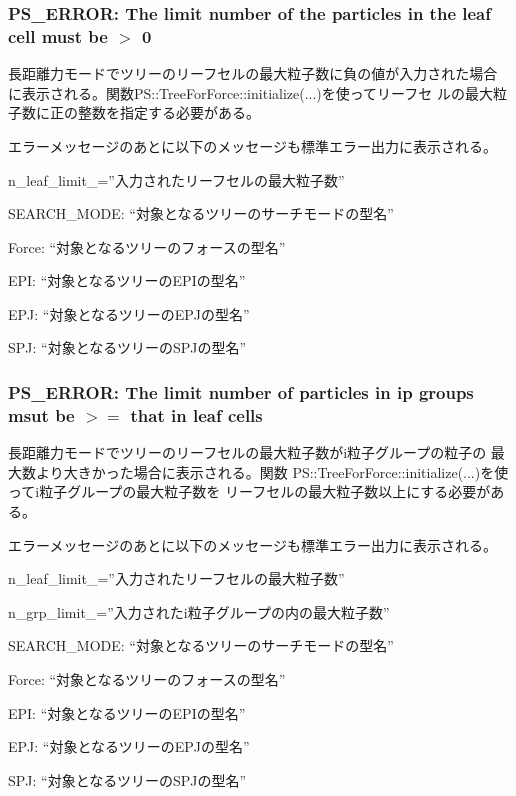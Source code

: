 \subsubsection{PS\_ERROR: The limit number of the particles in the leaf cell must be $>$ 0}

長距離力モードでツリーのリーフセルの最大粒子数に負の値が入力された場合
に表示される。関数{PS::TreeForForce::initialize(...)}を使ってリーフセ
ルの最大粒子数に正の整数を指定する必要がある。

エラーメッセージのあとに以下のメッセージも標準エラー出力に表示される。

\begin{screen}
  n\_leaf\_limit\_=''入力されたリーフセルの最大粒子数''

  SEARCH\_MODE: ``対象となるツリーのサーチモードの型名''

  Force: ``対象となるツリーのフォースの型名''

  EPI: ``対象となるツリーのEPIの型名''

  EPJ: ``対象となるツリーのEPJの型名''

  SPJ: ``対象となるツリーのSPJの型名''
  
\end{screen}

\subsubsection{PS\_ERROR: The limit number of particles in ip groups msut be $>=$ that in leaf cells}

長距離力モードでツリーのリーフセルの最大粒子数がi粒子グループの粒子の
最大数より大きかった場合に表示される。関数
{PS::TreeForForce::initialize(...)}を使ってi粒子グループの最大粒子数を
リーフセルの最大粒子数以上にする必要がある。

エラーメッセージのあとに以下のメッセージも標準エラー出力に表示される。

\begin{screen}
  n\_leaf\_limit\_=''入力されたリーフセルの最大粒子数''

  n\_grp\_limit\_=''入力されたi粒子グループの内の最大粒子数''

  SEARCH\_MODE: ``対象となるツリーのサーチモードの型名''

  Force: ``対象となるツリーのフォースの型名''

  EPI: ``対象となるツリーのEPIの型名''

  EPJ: ``対象となるツリーのEPJの型名''

  SPJ: ``対象となるツリーのSPJの型名''
  
\end{screen}

